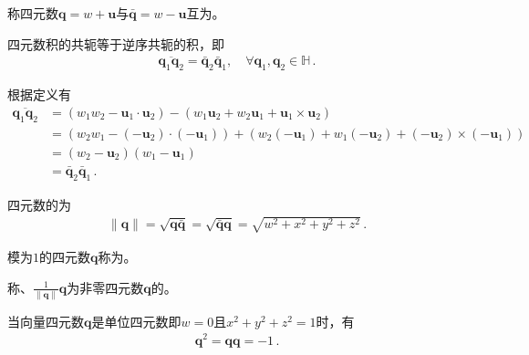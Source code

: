\begin{definition}
    称四元数${\bm q}=w+{\bm u}$与$\bar{\bm q}=w-{\bm u}$互为。
\end{definition}
\begin{proposition}
    四元数积的共轭等于逆序共轭的积，即
    \begin{align}
        \overline{{\bm q}_1{\bm q}_2}=\bar{\bm q}_2\bar{\bm q}_1, \quad\forall {\bm q}_1, {\bm q}_2\in\mathbb{H}\, .
    \end{align}
\end{proposition}
\begin{prove}
    根据定义有
    \begin{align}
        \overline{{\bm q}_1{\bm q}_2} & =(w_1w_2-{\bm u}_1\cdot{\bm u}_2)-(w_1{\bm u}_2+w_2{\bm u}_1+{\bm u}_1\times{\bm u}_2)\nonumber                   \\
                                      & =(w_2w_1-(-{\bm u}_2)\cdot(-{\bm u}_1))+(w_2(-{\bm u}_1)+w_1(-{\bm u}_2)+(-{\bm u}_2)\times(-{\bm u}_1))\nonumber \\
                                      & =(w_2-{\bm u}_2)(w_1-{\bm u}_1)\nonumber                                                                          \\
                                      & =\bar{\bm q}_2\bar{\bm q}_1\, .
    \end{align}
\end{prove}
\begin{definition}
    四元数的为
    \begin{align}
        \|{\bm q}\|=\sqrt{{\bm q}\bar{\bm q}}=\sqrt{\bar{\bm q}{\bm q}}=\sqrt{w^2+x^2+y^2+z^2}\, .
    \end{align}
\end{definition}
\begin{definition}
    模为$1$的四元数${\bm q}$称为。
\end{definition}
\begin{definition}
    称$、\displaystyle\frac{1}{\|{\bm q}\|}{\bm q}$为非零四元数${\bm q}$的。
\end{definition}
\begin{proposition}
    当向量四元数${\bm q}$是单位四元数即$w=0$且$x^2+y^2+z^2=1$时，有
    \begin{align}
        {\bm q}^2={\bm q}{\bm q}=-1\, .
    \end{align}
\end{proposition}
